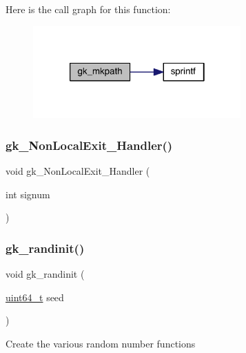 Here is the call graph for this function\+:\nopagebreak
\begin{figure}[H]
\begin{center}
\leavevmode
\includegraphics[width=226pt]{a00077_a89ed36115845151f1a66acabbf6b2284_cgraph}
\end{center}
\end{figure}
\mbox{\label{a00077_affdaa9477b1f6246649bdb3edd6ae49f}} 
\subsubsection{\texorpdfstring{gk\+\_\+\+Non\+Local\+Exit\+\_\+\+Handler()}{gk\_NonLocalExit\_Handler()}}
{\footnotesize\ttfamily void gk\+\_\+\+Non\+Local\+Exit\+\_\+\+Handler (\begin{DoxyParamCaption}\item[{int}]{signum }\end{DoxyParamCaption})}

\mbox{\label{a00077_a6a9fc2e9810099e03edc40607a7ea8aa}} 
\subsubsection{\texorpdfstring{gk\+\_\+randinit()}{gk\_randinit()}}
{\footnotesize\ttfamily void gk\+\_\+randinit (\begin{DoxyParamCaption}\item[{\hyperlink{a00119_aec6fcb673ff035718c238c8c9d544c47}{uint64\+\_\+t}}]{seed }\end{DoxyParamCaption})}

Create the various random number functions

